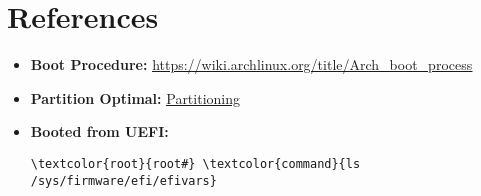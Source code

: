 \documentclass[10pt, a4paper, onecolumn, openany]{book} %
\begin{document}
\chapter{References}
\begin{itemize}
    \item \textbf{Boot Procedure:}
\newline \underline{\href{https://wiki.archlinux.org/title/Arch\_boot\_process}{https://wiki.archlinux.org/title/Arch\_boot\_process}}
    \item \textbf{Partition Optimal:}
\newline \underline{\href{https://rainbow.chard.org/2013/01/30/how-to-align-partitions-for-best-performance-using-parted/}{Partitioning}}
    \item \textbf{Booted from UEFI:}
\begin{Verbatim}[commandchars=\\\{\}]
\textcolor{root}{root#} \textcolor{command}{ls /sys/firmware/efi/efivars}
\end{Verbatim}
\end{itemize}
\end{document}

